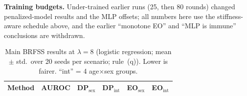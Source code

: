 \documentclass[conference]{IEEEtran}
\begin{document}
\textbf{Training budgets.} Under-trained earlier runs (25, then 80 rounds) changed penalized-model results and the MLP offsets; all numbers here use the stiffness-aware schedule above, and the earlier ``monotone EO'' and ``MLP is immune'' conclusions are withdrawn.

\begin{table}[t]
\centering
\caption{Main BRFSS results at $\lambda{=}8$ (logistic regression; mean $\pm$ std.\ over 20 seeds per scenario; rule~(q)). Lower is fairer. ``int'' = 4 age$\times$sex groups.}
\label{tab:main}
\begin{tabular}{lccccc}
\toprule
Method & AUROC & DP$_\text{sex}$ & DP$_\text{int}$ & EO$_\text{sex}$ & EO$_\text{int}$\\
\midrule

\bottomrule
\end{tabular}
\end{table}
\end{document}
